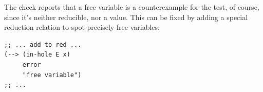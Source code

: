 The check reports that a free variable is a counterexample for the test,
of course, since it's neither reducible, nor a value. This can be fixed
by adding a special reduction relation to spot precisely free variables:
{
  \small
\begin{verbatim}
;; ... add to red ...
(--> (in-hole E x)
     error
     "free variable")
;; ...
\end{verbatim}
}


